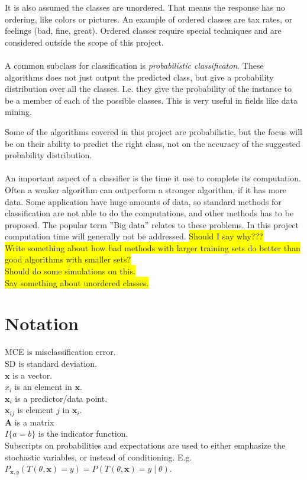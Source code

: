 It is also assumed the classes are unordered. That means the response has no ordering, like colors or pictures. An example of ordered classes are tax rates, or feelings (bad, fine, great). Ordered classes require special techniques and are considered outside the scope of this project. 
\\
\\
A common subclass for classification is \textit{probabilistic classificaton}. These algorithms does not just output the predicted class, but give a probability distribution over all the classes. I.e. they give the probability of the instance to be a member of each of the possible classes. This is very useful in fields like data mining. 

Some of the algorithms covered in this project are probabilistic, but the focus will be on their ability to predict the right class, not on the accuracy of the suggested probability distribution.
\\
\\
An important aspect of a classifier is the time it use to complete its computation. Often a weaker algorithm can outperform a stronger algorithm, if it has more data. Some application have huge amounts of data, so standard methods for classification are not able to do the computations, and other methods has to be proposed. The popular term ''Big data'' relates to these problems. In this project computation time will generally not be addressed. \colorbox{yellow}{Should I say why???}
\\

\colorbox{yellow}{Write something about how bad methods with larger training sets do better than good algorithms with smaller sets?}\\
\colorbox{yellow}{Should do some simulations on this.}\\
\colorbox{yellow}{Say something about unordered classes.}


\section{Notation}
\label{sec:Notation}
MCE is misclassification error. \\
SD is standard deviation. \\
$\mathbf{x}$ is a vector. \\
$x_i$ is an element in $\mathbf{x}$. \\
$\mathbf{x}_i$ is a predictor/data point.  \\
$\mathbf{x}_{ij}$ is element $j$ in $\mathbf{x}_i$. \\
$\mathbf{A}$ is a matrix \\
$I\{a = b\}$ is the indicator function.\\
Subscripts on probabilities and expectations are used to either emphasize the stochastic variables, or instead of conditioning. 
E.g. $P_{\mathbf{x}, y}(T(\theta, \mathbf{x}) = y) = P(T(\theta, \mathbf{x}) = y \mid \theta)$.


